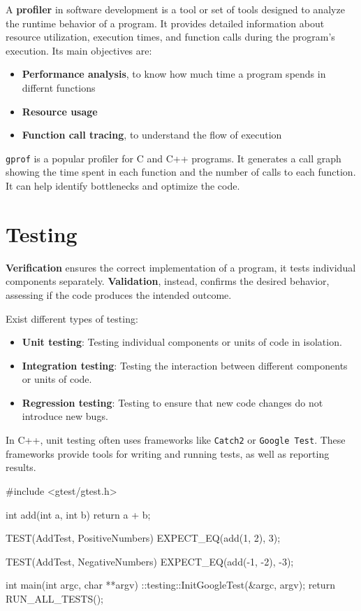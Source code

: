 A \textbf{profiler} in software development is a tool or set of tools designed to analyze the runtime behavior of a program. It provides detailed information about resource utilization, execution times, and function calls during the program's execution. Its main objectives are:
\begin{itemize}
    \item \textbf{Performance analysis}, to know how much time a program spends in differnt functions
    \item \textbf{Resource usage}
    \item \textbf{Function call tracing}, to understand the flow of execution
\end{itemize}

\texttt{gprof} is a popular profiler for C and C++ programs. It generates a call graph showing the time spent in each function and the number of calls to each function. It can help identify bottlenecks and optimize the code.

\section{Testing}

\textbf{Verification} ensures the correct implementation of a program, it tests individual components separately. 
\textbf{Validation}, instead, confirms the desired behavior, assessing if the code produces the intended outcome. 

Exist different types of testing:
\begin{itemize}
    \item \textbf{Unit testing}: Testing individual components or units of code in isolation.
    \item \textbf{Integration testing}: Testing the interaction between different components or units of code.
    \item \textbf{Regression testing}: Testing to ensure that new code changes do not introduce new bugs.
\end{itemize}

In C++, unit testing often uses frameworks like \texttt{Catch2} or \texttt{Google Test}. These frameworks provide tools for writing and running tests, as well as reporting results.

\begin{exampleblock}
    \begin{codeblock}[language=c++]
        #include <gtest/gtest.h>
        
        int add(int a, int b) {
            return a + b;
        }
        
        TEST(AddTest, PositiveNumbers) {
            EXPECT_EQ(add(1, 2), 3);
        }
        
        TEST(AddTest, NegativeNumbers) {
            EXPECT_EQ(add(-1, -2), -3);
        }
        
        int main(int argc, char **argv) {
            ::testing::InitGoogleTest(&argc, argv);
            return RUN_ALL_TESTS();
        }
    \end{codeblock}
\end{exampleblock}

